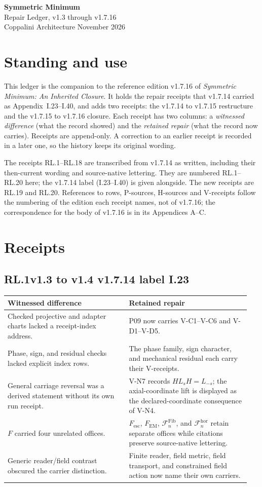 \documentclass[11pt,a4paper]{article}
\makeatletter
\newcommand{\Fesc}{F_{\mathrm{esc}}}\newcommand{\FEM}{F_{\mathrm{EM}}}
\newcommand{\rbegin}[3]{\subsection*{#1\quad #2 \hfill {\normalfont\small #3}}\addcontentsline{toc}{subsection}{#1\quad #2}%
  \begin{longtable}{@{}>{\raggedright\arraybackslash}p{0.475\linewidth}@{\hspace{1.2em}}>{\raggedright\arraybackslash}p{0.475\linewidth}@{}}
  \toprule Witnessed difference & Retained repair\\\midrule\endhead\bottomrule\endfoot}
\newcommand{\rend}{\end{longtable}}
\newcommand{\row}[2]{#1 & #2\\[4pt]}
\makeatother
\begin{document}
\begin{center}
{\LARGE\bfseries Symmetric Minimum}\\[3pt]
{\large Repair Ledger, v1.3 through v1.7.16}\\[3pt]
Coppalini Architecture  November 2026
\end{center}
\vspace{4pt}

\section*{Standing and use}
This ledger is the companion to the reference edition v1.7.16 of \emph{Symmetric Minimum: An Inherited Closure}. It holds the repair receipts that v1.7.14 carried as Appendix~I.23--I.40, and adds two receipts: the v1.7.14 to v1.7.15 restructure and the v1.7.15 to v1.7.16 closure. Each receipt has two columns: a \emph{witnessed difference} (what the record showed) and the \emph{retained repair} (what the record now carries). Receipts are append-only. A correction to an earlier receipt is recorded in a later one, so the history keeps its original wording.

The receipts RL.1--RL.18 are transcribed from v1.7.14 as written, including their then-current wording and source-native lettering. They are numbered RL.1--RL.20 here; the v1.7.14 label (I.23--I.40) is given alongside. The new receipts are RL.19 and RL.20. References to rows, P-sources, H-sources and V-receipts follow the numbering of the edition each receipt names, not of v1.7.16; the correspondence for the body of v1.7.16 is in its Appendices A--C.

\renewcommand{\contentsname}{Receipts}
\tableofcontents

\newpage
\section*{Receipts}

\rbegin{RL.1}{v1.3 to v1.4}{v1.7.14 label I.23}
\row{Checked projective and adapter charts lacked a receipt-index address.}{P09 now carries V-C1--V-C6 and V-D1--V-D5.}
\row{Phase, sign, and residual checks lacked explicit index rows.}{The phase family, sign character, and mechanical residual each carry their V-receipts.}
\row{General carriage reversal was a derived statement without its own run receipt.}{V-N7 records $HL_sH=L_{-s}$; the axial-coordinate lift is displayed as the declared-coordinate consequence of V-N4.}
\row{$F$ carried four unrelated offices.}{$\Fesc$, $\FEM$, $\mathcal F^{\mathrm{Fib}}_n$, and $\mathcal F^{\mathrm{hor}}_n$ retain separate offices while citations preserve source-native lettering.}
\row{Generic reader/field contrast obscured the carrier distinction.}{Finite reader, field metric, field transport, and constrained field action now name their own carriers.}
\rend
\end{document}
